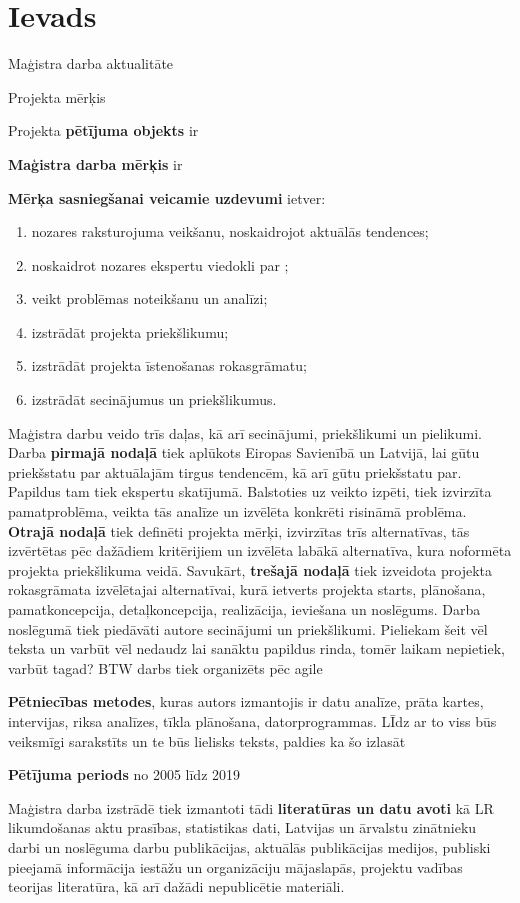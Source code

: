 \chapter*{Ievads} %
Maģistra darba aktualitāte
\par
Projekta mērķis
\par
Projekta \textbf{pētījuma objekts} ir
\par
\textbf{Maģistra darba mērķis} ir 
\par
\textbf{Mērķa sasniegšanai veicamie uzdevumi} ietver:
\begin{enumerate}
    \item nozares raksturojuma veikšanu, noskaidrojot aktuālās tendences;
    \item noskaidrot nozares ekspertu viedokli par ;
    \item veikt problēmas noteikšanu un analīzi;
    \item izstrādāt projekta priekšlikumu;
    \item izstrādāt projekta īstenošanas rokasgrāmatu;
    \item izstrādāt secinājumus un priekšlikumus.
\end{enumerate}
\par
Maģistra darbu veido trīs daļas, kā arī secinājumi, priekšlikumi un pielikumi.
Darba \textbf{pirmajā nodaļā} tiek aplūkots Eiropas Savienībā un Latvijā, lai gūtu priekšstatu par 
aktuālajām tirgus tendencēm, kā arī gūtu priekšstatu par. Papildus tam tiek ekspertu skatījumā. 
Balstoties uz veikto izpēti, tiek izvirzīta pamatproblēma, veikta tās analīze un izvēlēta konkrēti
risināmā problēma. 
\textbf{Otrajā nodaļā} tiek definēti projekta mērķi,
izvirzītas trīs alternatīvas, tās izvērtētas pēc dažādiem kritērijiem un izvēlēta labākā alternatīva, 
kura noformēta projekta priekšlikuma veidā. 
Savukārt, \textbf{trešajā nodaļā} tiek izveidota projekta
rokasgrāmata izvēlētajai alternatīvai, kurā ietverts projekta starts, plānošana, pamatkoncepcija,
detaļkoncepcija, realizācija, ieviešana un noslēgums. 
Darba noslēgumā tiek piedāvāti autore secinājumi un priekšlikumi. Pieliekam šeit vēl teksta un 
varbūt vēl nedaudz lai sanāktu papildus rinda, tomēr laikam nepietiek, varbūt tagad? BTW darbs tiek
organizēts pēc \gls{agile}
\par
\textbf{Pētniecības metodes}, kuras autors izmantojis ir datu analīze,
prāta kartes, intervijas, riksa analīzes, tīkla plānošana, datorprogrammas. LĪdz ar to viss 
būs veiksmīgi sarakstīts un te būs lielisks teksts, paldies ka šo izlasāt
\par
\textbf{Pētījuma periods} no 2005 līdz 2019
\par
Maģistra darba izstrādē tiek izmantoti tādi \textbf{literatūras un datu avoti} kā LR likumdošanas aktu
prasības, statistikas dati, Latvijas un ārvalstu zinātnieku darbi un noslēguma darbu publikācijas,
aktuālās publikācijas medijos, publiski pieejamā informācija iestāžu un organizāciju mājaslapās,
projektu vadības teorijas literatūra, kā arī dažādi nepublicētie materiāli.